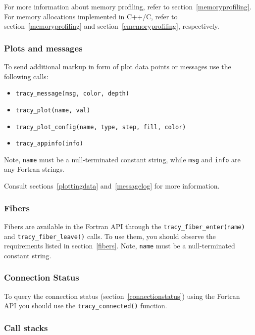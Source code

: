 \documentclass[hidelinks,titlepage,a4paper,twoside]{article}
\begin{document}
For more information about memory profiling, refer to section~\ref{memoryprofiling}.
For memory allocations implemented in C++/C,  refer to section~\ref{memoryprofiling} and section~\ref{cmemoryprofiling}, respectively.

\subsubsection{Plots and messages}

To send additional markup in form of plot data points or messages use the following calls:

\begin{itemize}
\item \texttt{tracy\_message(msg, color, depth)}
\item \texttt{tracy\_plot(name, val)}
\item \texttt{tracy\_plot\_config(name, type, step, fill, color)}
\item \texttt{tracy\_appinfo(info)}
\end{itemize}

Note, \texttt{name} must be a null-terminated constant string, while \texttt{msg} and \texttt{info} are any Fortran strings.

Consult sections~\ref{plottingdata} and~\ref{messagelog} for more information.

\subsubsection{Fibers}

Fibers are available in the Fortran API through the \texttt{tracy\_fiber\_enter(name)} and \texttt{tracy\_fiber\_leave()} calls. To use them, you should observe the requirements listed in section~\ref{fibers}.
Note, \texttt{name} must be a null-terminated constant string.

\subsubsection{Connection Status}

To query the connection status (section~\ref{connectionstatus}) using the Fortran API you should use the \texttt{tracy\_connected()} function.

\subsubsection{Call stacks}
\end{document}
